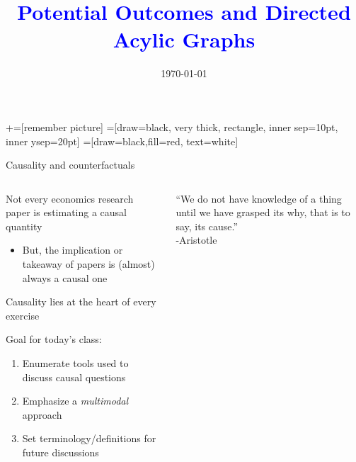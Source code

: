 \documentclass[notes,11pt, aspectratio=169]{beamer}
\title[]{\textcolor{blue}{Potential Outcomes and Directed Acylic Graphs}}
\author[PGP]{}
\institute[FRBNY]{\small{Paul Goldsmith-Pinkham}}
\date{\today}
\newenvironment{wideitemize}{\itemize\addtolength{\itemsep}{10pt}}{\enditemize}
\begin{document}
\newcommand\marktopleft[1]{%
    \tikz[overlay,remember picture] 
        \node (marker-#1-a) at (-.3em,.3em) {};%
}
\newcommand\markbottomright[2]{%
    \tikz[overlay,remember picture] 
        \node (marker-#1-b) at (0em,0em) {};%
}
+=[remember picture] 
 =[draw=black, very thick, rectangle, inner sep=10pt, inner ysep=20pt]
 =[draw=black,fill=red, text=white]

\begin{frame}
\maketitle

\end{frame}

\begin{frame}{Causality and counterfactuals}
\begin{columns}[T] %
\begin{column}{.58\textwidth}
  \begin{wideitemize}
  \item Not every economics research paper
    is estimating a causal quantity
    \begin{itemize}
    \item But, the implication or takeaway of papers is (almost) always
      a causal one
    \end{itemize}
  \item Causality lies at the heart of every exercise
  \item Goal for today's class:
    \begin{enumerate}
    \item Enumerate tools used to discuss causal questions
    \item Emphasize a \emph{multimodal} approach
    \item Set terminology/definitions for future discussions
    \end{enumerate}
  \end{wideitemize}
\end{column}%
\hfill%
\begin{column}{.38\textwidth}
  \vfill
  ``We do not have knowledge of a thing until we have grasped its why, that is to say, its cause.''\\
\hfill  -Aristotle

\end{column}%
\end{columns}
\end{frame}
\end{document}

